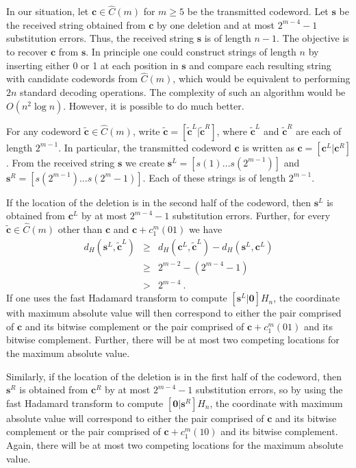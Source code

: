 In our situation, let $\mathbf{c} \in \hat{C}(m)$ for $m \geq 5$
be the transmitted codeword. Let $\mathbf{s}$ be the received
string obtained from $\mathbf{c}$ by one deletion and at most
$2^{m-4}-1$ substitution errors. Thus, the received string
$\mathbf{s}$ is of length $n-1$. The objective is to recover
$\mathbf{c}$ from $\mathbf{s}$. In principle one could construct
strings of length $n$ by inserting either 0 or 1 at each position
in $\mathbf{s}$ and compare each resulting string with candidate
codewords from $\hat{C}(m)$, which would be equivalent to
performing $2n$ standard decoding operations. The complexity of
such an algorithm would be $O(n^2 \log n)$. However, it is
possible to do much better.

For any codeword $\tilde{\mathbf{c}} \in \hat{C}(m)$, write
$\tilde{\mathbf{c}} = \left[ \tilde{\mathbf{c}}^L |
\tilde{\mathbf{c}}^R \right]$, where $\tilde{\mathbf{c}}^L$ and
$\tilde{\mathbf{c}}^R$ are each of length $2^{m-1}$. In
particular, the transmitted codeword $\mathbf{c}$ is written as
$\mathbf{c} = \left[ \mathbf{c}^L | \mathbf{c}^R \right]$. From
the received string $\mathbf{s}$ we create $\mathbf{s}^L = \left[
s(1) \ldots s(2^{m-1}) \right]$ and $\mathbf{s}^R = \left[
s(2^{m-1}) \ldots s(2^m -1) \right]$. Each of these strings is of
length $2^{m-1}$.

If the location of the deletion is in the second half of the
codeword, then $\mathbf{s}^L$ is obtained from $\mathbf{c}^L$ by
at most  $2^{m-4}-1$ substitution errors. Further, for every
$\tilde{\mathbf{c}} \in \hat{C}(m)$ other than $\mathbf{c}$ and
$\mathbf{c} + c_1^m(01)$ we have
\begin{eqnarray*}
d_H(\mathbf{s}^L, \tilde{\mathbf{c}}^L) &\ge& d_H(\mathbf{c}^L,
\tilde{\mathbf{c}}^L) - d_H(\mathbf{s}^L, \mathbf{c}^L)\\
{}& \ge& 2^{m-2} - (2^{m-4} -1)\\ {}&> &2^{m-4}~.
\end{eqnarray*}
If one uses the fast Hadamard transform to compute $\left[
\mathbf{s}^L | \mathbf{0} \right] H_n$, the coordinate with
maximum absolute value will then correspond to either the pair
comprised of $\mathbf{c}$ and its bitwise complement or the pair
comprised of $\mathbf{c} + c_1^m(01)$ and its bitwise complement.
Further, there will be at most two competing locations for the
maximum absolute value.

Similarly, if the location of the deletion is in the first half of
the codeword, then $\mathbf{s}^R$ is obtained from $\mathbf{c}^R$
by at most  $2^{m-4}-1$ substitution errors, so by using the fast
Hadamard transform to compute $\left[ \mathbf{0} | \mathbf{s}^R
\right] H_n$, the coordinate with maximum absolute value will
correspond to either the pair comprised of $\mathbf{c}$ and its
bitwise complement or the pair comprised of $\mathbf{c} +
c_1^m(10)$ and its bitwise complement. Again, there will be at
most two competing locations for the maximum absolute value.

